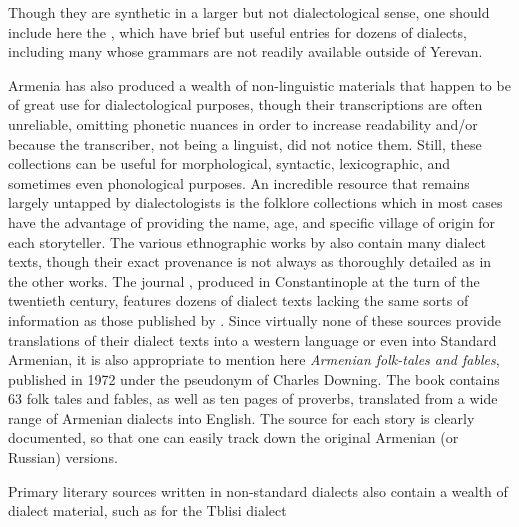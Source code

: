 Though they are synthetic in a larger but not dialectological sense, one should include here the , which have brief but useful entries for dozens of dialects, including many whose grammars are not readily available outside of Yerevan.


Armenia has also produced a wealth of non-linguistic materials that happen to be of great use for dialectological purposes, though their transcriptions are often unreliable, omitting phonetic nuances in order to increase readability and/or because the transcriber, not being a linguist, did not notice them. Still, these collections can be useful for morphological, syntactic, lexicographic, and sometimes even phonological purposes. An incredible resource that remains largely untapped by dialectologists is the folklore collections  which in most cases have the advantage of providing the name, age, and specific village of origin for each storyteller. The various ethnographic works by  also contain many dialect texts, though their exact provenance is not always as thoroughly detailed as in the other works. The journal , produced in Constantinople at the turn of the twentieth century, features dozens of dialect texts lacking the same sorts of information as those published by . Since virtually none of these sources  provide translations of their dialect texts into a western language or even into Standard Armenian, it is also appropriate to mention here  \textit{Armenian folk-tales and fables}, published in 1972 under the pseudonym of Charles Downing. The book contains 63 folk tales and fables, as well as ten pages of proverbs, translated from a wide range of Armenian dialects into English. The source for each story is clearly documented, so that one can easily track down the original Armenian (or Russian) versions.

Primary literary sources written in non-standard dialects also contain a wealth of dialect material, such as for the Tblisi dialect 

